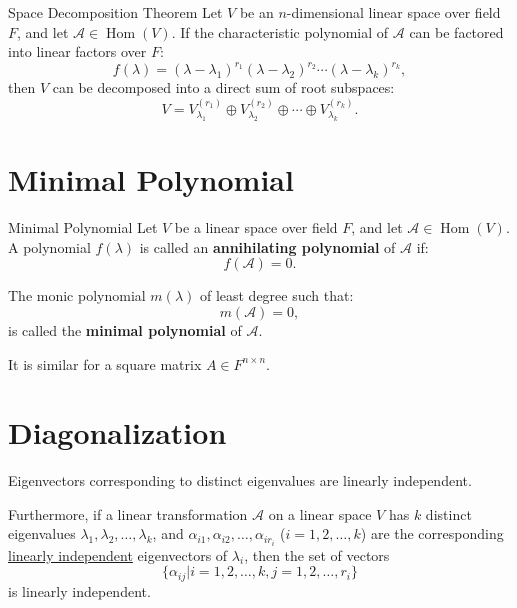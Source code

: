 \documentclass[11pt]{../../TexTemplate/elegantbook} %
\begin{document}
\begin{theorem}{Space Decomposition Theorem}\label{theorem:space_decomposition}
    Let \( V \) be an \( n \)-dimensional linear space over field \( F \), 
    and let \( \mathcal{A}\in \operatorname{Hom}(V) \).
    If the characteristic polynomial of \( \mathcal{A} \) can be factored into linear factors over \( F \):
    \[
    f(\lambda) = ( \lambda - \lambda_1)^{r_1} ( \lambda - \lambda_2)^{r_2} \cdots ( \lambda - \lambda_k)^{r_k},
    \]
    then \(V\) can be decomposed into a direct sum of root subspaces:
    \[
    V = V_{\lambda_1}^{(r_1)} \oplus V_{\lambda_2}^{(r_2)} \oplus \cdots \oplus V_{\lambda_k}^{(r_k)}.
    \]
\end{theorem}


\section{Minimal Polynomial}
\begin{definition}{Minimal Polynomial}
    Let \( V \) be a linear space over field \( F \), 
    and let \( \mathcal{A}\in \operatorname{Hom}(V) \).
    A polynomial \( f(\lambda) \) is called an \textbf{annihilating polynomial} of \( \mathcal{A} \) if:
    \[
    f(\mathcal{A}) = 0.
    \]

    The monic polynomial \( m(\lambda) \) of least degree such that:
    \[
    m(\mathcal{A}) = 0,
    \]
    is called the \textbf{minimal polynomial} of \( \mathcal{A} \).

    It is similar for a square matrix \( A \in F^{n \times n} \).
\end{definition}


\section{Diagonalization}
\begin{lemma}
    Eigenvectors corresponding to distinct eigenvalues are linearly independent.

    Furthermore, if a linear transformation \( \mathcal{A} \) on a linear space \( V \)
    has \( k \) distinct eigenvalues \( \lambda_1, \lambda_2, \dots, \lambda_k \),
    and \( \alpha_{i1}, \alpha_{i2}, \dots, \alpha_{ir_{i}} \) (\(i = 1, 2, \dots, k\)) 
    are the corresponding \underline{linearly independent} eigenvectors of \( \lambda_i \),
    then the set of vectors
    \[
    \{ \alpha_{ij} | i = 1, 2, \dots, k, j = 1, 2, \dots, r_i \}
    \]
    is linearly independent.
\end{lemma}
\end{document}
